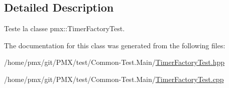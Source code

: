 \subsection{Detailed Description}
Teste la classe pmx\+::\+Timer\+Factory\+Test. 

The documentation for this class was generated from the following files\+:\begin{DoxyCompactItemize}
\item 
/home/pmx/git/\+P\+M\+X/test/\+Common-\/\+Test.\+Main/\hyperlink{TimerFactoryTest_8hpp}{Timer\+Factory\+Test.\+hpp}\item 
/home/pmx/git/\+P\+M\+X/test/\+Common-\/\+Test.\+Main/\hyperlink{TimerFactoryTest_8cpp}{Timer\+Factory\+Test.\+cpp}\end{DoxyCompactItemize}
